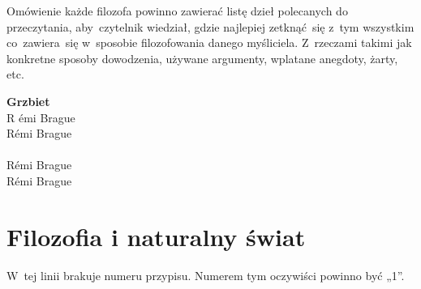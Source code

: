 \documentclass[a4paper,11pt]{article}
\begin{document}



\noi {}

\vspace{\spaceFour}


\start Omówienie każde filozofa powinno zawierać listę dzieł
polecanych do przeczytania, aby~czytelnik wiedział, gdzie najlepiej
zetknąć~się z~tym wszystkim co~zawiera~się w~sposobie filozofowania
danego myśliciela. Z~rzeczami takimi jak konkretne sposoby dowodzenia,
używane argumenty, wplatane anegdoty, żarty, etc.

\noindent
\textbf{Grzbiet} \\
\Jest R \'{e}mi {\small Brague} \\
\Powin R\'{e}mi Brague \\
 \\
\Jest R\'{e}mi {\small Brague} \\
\Powin R\'{e}mi Brague \\


\vspace{\spaceTwo}










\newpage
\section{Filozofia i naturalny świat}

\vspace{\spaceTwo}






\start {} W~tej linii brakuje numeru przypisu. Numerem tym
oczywiści powinno być „1”.

\vspace{\spaceFour}
\end{document}
